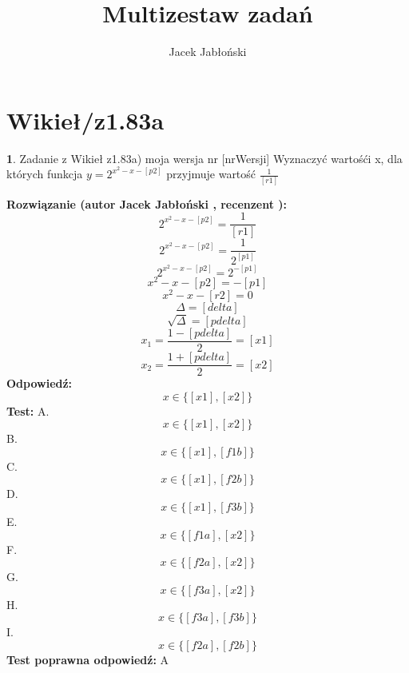\documentclass[12pt, a4paper]{article}
\title{Multizestaw zadań}
\author{Jacek Jabłoński}
\date{}
\theoremstyle{definition} %
\newtheorem{zad}{}
\newcommand{\kategoria}[1]{\section{#1}} %
\newcommand{\zadStart}[1]{\begin{zad}#1\newline} %
\newcommand{\zadStop}{\end{zad}}   %
\newcommand{\rozwStart}[2]{\noindent \textbf{Rozwiązanie (autor #1 , recenzent #2): }\newline} %
\newcommand{\rozwStop}{\newline}                                            %
\newcommand{\odpStart}{\noindent \textbf{Odpowiedź:}\newline}    %
\newcommand{\odpStop}{\newline}                                             %
\newcommand{\testStart}{\noindent \textbf{Test:}\newline} %
\newcommand{\testStop}{\newline} %
\newcommand{\kluczStart}{\noindent \textbf{Test poprawna odpowiedź:}\newline} %
\newcommand{\kluczStop}{\newline} %
\begin{document}
\maketitle


\kategoria{Wikieł/z1.83a}
\zadStart{Zadanie z Wikieł z1.83a) moja wersja nr [nrWersji]}
Wyznaczyć wartośći x, dla których funkcja $y=2^{x^2-x-[p2]}$ przyjmuje wartość $\frac{1}{[r1]}$
\zadStop
\rozwStart{Jacek Jabłoński}{}
$$2^{x^2-x-[p2]} = \frac{1}{[r1]} $$
$$2^{x^2-x-[p2]} = \frac{1}{2^{[p1]}} $$
$$2^{x^2-x-[p2]} = 2^{-[p1]}$$
$$x^2-x-[p2] = -[p1]$$
$$x^2-x-[r2] = 0$$
$$\Delta = [delta]$$
$$\sqrt{\Delta} = [pdelta]$$
$$x_1 = \frac{1 - [pdelta]}{2} = [x1]$$
$$x_2 = \frac{1 + [pdelta]}{2} = [x2]$$
\rozwStop
\odpStart
$$x \in \{[x1],[x2]\}$$
\odpStop
\testStart
A. $$x \in \{[x1],[x2]\}$$
B. $$x \in \{[x1],[f1b]\}$$
C. $$x \in \{[x1],[f2b]\}$$
D. $$x \in \{[x1],[f3b]\}$$
E. $$x \in \{[f1a],[x2]\}$$
F. $$x \in \{[f2a],[x2]\}$$
G. $$x \in \{[f3a],[x2]\}$$
H. $$x \in \{[f3a],[f3b]\}$$
I. $$x \in \{[f2a],[f2b]\}$$
\testStop
\kluczStart
A
\kluczStop
\end{document}
